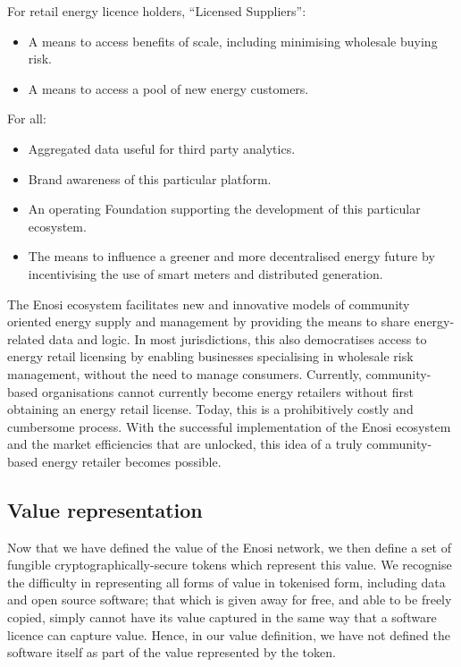 \documentclass{article}
\theoremstyle{definition}
\theoremstyle{plain} %
\begin{document}
\noindent For retail energy licence holders, “Licensed Suppliers”:

\begin{itemize}
\item{A means to access benefits of scale, including minimising wholesale buying risk.}
\item{A means to access a pool of new energy customers.\\}
\end{itemize}

\noindent For all:

\begin{itemize}
\item{Aggregated data useful for third party analytics.}
\item{Brand awareness of this particular platform.}
\item{An operating Foundation supporting the development of this particular ecosystem.}
\item{The means to influence a greener and more decentralised energy future by incentivising the use of smart meters and distributed generation.\\}
\end{itemize}

\noindent The Enosi ecosystem facilitates new and innovative models of community oriented energy supply and management by providing the means to share energy-related data and logic. In most jurisdictions, this also democratises access to energy retail licensing by enabling businesses specialising in wholesale risk management, without the need to manage consumers. Currently, community-based organisations cannot currently become energy retailers without first obtaining an energy retail license. Today, this is a prohibitively costly and cumbersome process. With the successful implementation of the Enosi ecosystem and the market efficiencies that are unlocked, this idea of a truly community-based energy retailer becomes possible.

\subsection{Value representation}

Now that we have defined the value of the Enosi network, we then define a set of fungible cryptographically-secure tokens which represent this value. We recognise the difficulty in representing all forms of value in tokenised form, including data and open source software; that which is given away for free, and able to be freely copied, simply cannot have its value captured in the same way that a software licence can capture value. Hence, in our value definition, we have not defined the software itself as part of the value represented by the token.\\
\end{document}
